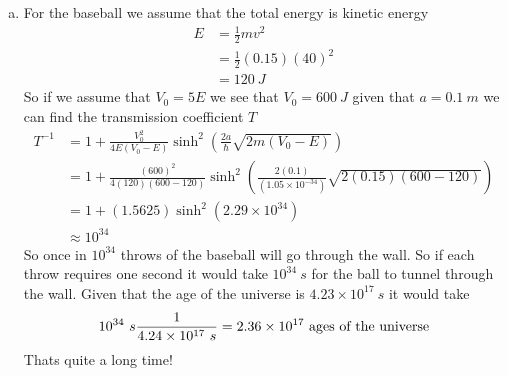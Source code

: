 \documentclass[11pt]{article}
\numberwithin{equation}{section}
\begin{document}
\begin{enumerate}[(a)]
\item
For the baseball we assume that the total energy is kinetic energy
\begin{align*}
E &= \frac{1}{2}mv^2\\
&= \frac{1}{2}(0.15)(40)^2\\
&= 120\ J
\end{align*}
So if we assume that $V_0 = 5E$ we see that $V_0 = 600\ J$ given that $a=0.1\ m$ we can find the transmission coefficient $T$
\begin{align*}
T^{-1} &=  1+\frac{V_0^2}{4E(V_0-E)}\sinh^2\left(\frac{2a}{\hbar}\sqrt{2m(V_0-E)}\right)\\
&=  1+\frac{(600)^2}{4(120)(600-120)}\sinh^2\left(\frac{2(0.1)}{(1.05\times10^{-34})}\sqrt{2(0.15)(600-120)}\right)\\
&=  1+(1.5625)\sinh^2\left(2.29\times10^{34}\right)\\
&\approx 10^{34}
\end{align*}
So once in $10^{34}$ throws of the baseball will go through the wall. So if each throw requires one second it would take $10^{34}\ s$ for the ball to tunnel through the wall. Given that the age of the universe is $4.23\times10^{17}\ s$ it would take 
$$10^{34}\ s \frac{1}{4.24\times10^{17}\ s} = 2.36\times 10^{17}\ \textnormal{ages of the universe}$$
Thats quite a long time!
\end{enumerate}
\end{document}
